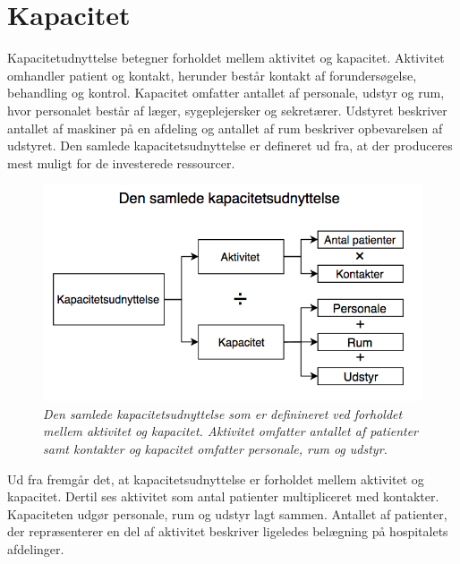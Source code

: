 \section{Kapacitet} \label{kap}
Kapacitetudnyttelse betegner forholdet mellem aktivitet og kapacitet. Aktivitet omhandler patient og kontakt, herunder består kontakt af forundersøgelse, behandling og kontrol. Kapacitet omfatter antallet af personale, udstyr og rum, hvor personalet består af læger, sygeplejersker og sekretærer. Udstyret beskriver antallet af maskiner på en afdeling og antallet af rum beskriver opbevarelsen af udstyret. Den samlede kapacitetsudnyttelse er defineret ud fra, at der produceres mest muligt for de investerede ressourcer.\cite{Company2013} 

\begin{figure}[H]
	\flushleft 
	\centering
	\includegraphics[scale=.65]{figures/Kapacitetsudnyttelse.png}
	\flushleft
	\caption{\textit{Den samlede kapacitetsudnyttelse som er definineret ved forholdet mellem aktivitet og kapacitet. Aktivitet omfatter antallet af patienter samt kontakter og kapacitet omfatter personale, rum og udstyr.}\cite{Company2013}}
	\label{kapacitet}
\end{figure}

\noindent
Ud fra  fremgår det, at kapacitetsudnyttelse er forholdet mellem aktivitet og kapacitet. Dertil ses aktivitet som antal patienter multipliceret med kontakter. Kapaciteten udgør personale, rum og udstyr lagt sammen. Antallet af patienter, der repræsenterer en del af aktivitet beskriver ligeledes belægning på hospitalets afdelinger.\cite{Company2013} 

